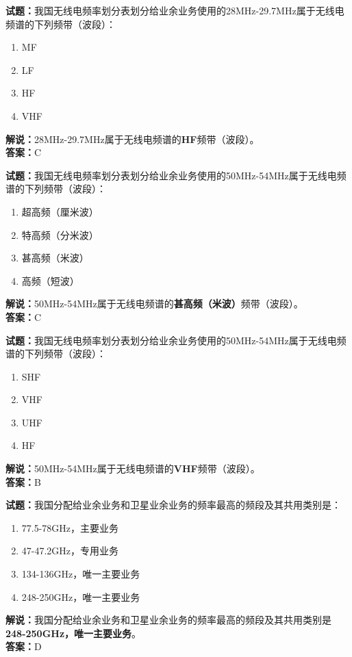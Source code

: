 \documentclass{ctexbook}
\begin{document}
\bigskip

\noindent\textbf{试题：}我国无线电频率划分表划分给业余业务使用的28\unit{\MHz}-29.7\unit{\MHz}属于无线电频谱的下列频带（波段）：
\begin{enumerate}[leftmargin=3em]
  \item MF
  \item LF
  \item HF
  \item VHF
\end{enumerate}
\noindent\textbf{解说：}28\unit{\MHz}-29.7\unit{\MHz}属于无线电频谱的\textbf{HF}频带（波段）。\\\noindent\textbf{答案：}C

\bigskip

\noindent\textbf{试题：}我国无线电频率划分表划分给业余业务使用的50\unit{\MHz}-54\unit{\MHz}属于无线电频谱的下列频带（波段）：
\begin{enumerate}[leftmargin=3em]
  \item 超高频（厘米波）
  \item 特高频（分米波）
  \item 甚高频（米波）
  \item 高频（短波）
\end{enumerate}
\noindent\textbf{解说：}50\unit{\MHz}-54\unit{\MHz}属于无线电频谱的\textbf{甚高频（米波）}频带（波段）。\\\noindent\textbf{答案：}C

\bigskip

\noindent\textbf{试题：}我国无线电频率划分表划分给业余业务使用的50\unit{\MHz}-54\unit{\MHz}属于无线电频谱的下列频带（波段）：
\begin{enumerate}[leftmargin=3em]
  \item SHF
  \item VHF
  \item UHF
  \item HF
\end{enumerate}
\noindent\textbf{解说：}50\unit{\MHz}-54\unit{\MHz}属于无线电频谱的\textbf{VHF}频带（波段）。\\\noindent\textbf{答案：}B

\bigskip

\noindent\textbf{试题：}我国分配给业余业务和卫星业余业务的频率最高的频段及其共用类别是：
\begin{enumerate}[leftmargin=3em]
  \item 77.5-78\unit{\GHz}，主要业务
  \item 47-47.2\unit{\GHz}，专用业务
  \item 134-136\unit{\GHz}，唯一主要业务
  \item 248-250\unit{\GHz}，唯一主要业务
\end{enumerate}
\noindent\textbf{解说：}我国分配给业余业务和卫星业余业务的频率最高的频段及其共用类别是\textbf{248-250\unit{\GHz}，唯一主要业务}。\\\noindent\textbf{答案：}D
\end{document}

